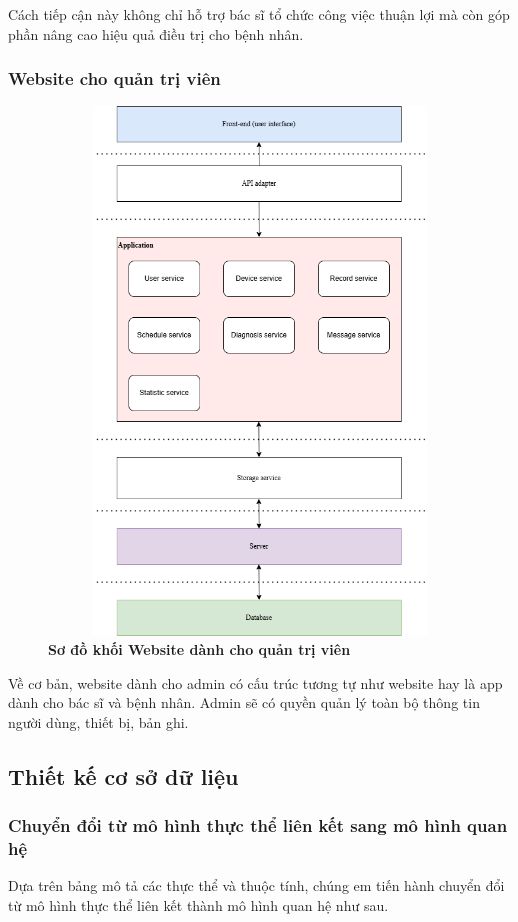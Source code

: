 Cách tiếp cận này không chỉ hỗ trợ bác sĩ tổ chức công việc thuận lợi mà còn góp phần nâng cao hiệu quả điều trị cho bệnh nhân.

\subsubsection{Website cho quản trị viên}
\begin{figure}[H]
  \centering
  \includegraphics[width=12cm,height=14cm]{Images/System/fmECG_architecture-Admin.drawio.png}
  \caption[Sơ đồ khối Website dành cho quản trị viên]{\bfseries \fontsize{12pt}{0pt}\selectfont Sơ đồ khối Website dành cho quản trị viên}
  \label{fmECG_architecture-Admin} %
\end{figure}
Về cơ bản, website dành cho admin có cấu trúc tương tự như website hay là app dành cho bác sĩ và bệnh nhân.
Admin sẽ có quyền quản lý toàn bộ thông tin người dùng, thiết bị, bản ghi.

\subsection{Thiết kế cơ sở dữ liệu}

\subsubsection{Chuyển đổi từ mô hình thực thể liên kết sang mô hình quan hệ}
Dựa trên bảng mô tả các thực thể và thuộc tính, chúng em tiến hành chuyển đổi từ mô hình thực thể liên kết thành mô hình quan hệ như sau.

